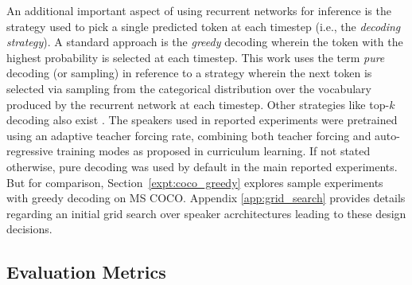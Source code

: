 An additional important aspect of using recurrent networks for inference is the strategy used to pick a single predicted token at each timestep (i.e., the \textit{decoding strategy}). A standard approach is the \textit{greedy} decoding wherein the token with the highest probability is selected at each timestep. %
This work uses the term \textit{pure} decoding (or sampling) in reference to a strategy wherein the next token is selected via sampling from the categorical distribution over the vocabulary produced by the recurrent network at each timestep. Other strategies like top-$k$ decoding also exist \parencite{lazaridou2020multi}.  
The speakers used in reported experiments were pretrained using an adaptive teacher forcing rate, combining both teacher forcing and auto-regressive training modes as proposed in curriculum learning. If not stated otherwise, pure decoding was used by default in the main reported experiments. But for comparison, Section~\ref{expt:coco_greedy} explores sample experiments with greedy decoding on MS COCO. Appendix \ref{app:grid_search} provides details regarding an initial grid search over speaker acrchitectures leading to these design decisions.

\subsection{Evaluation Metrics}
\label{image_cap_metrics}

